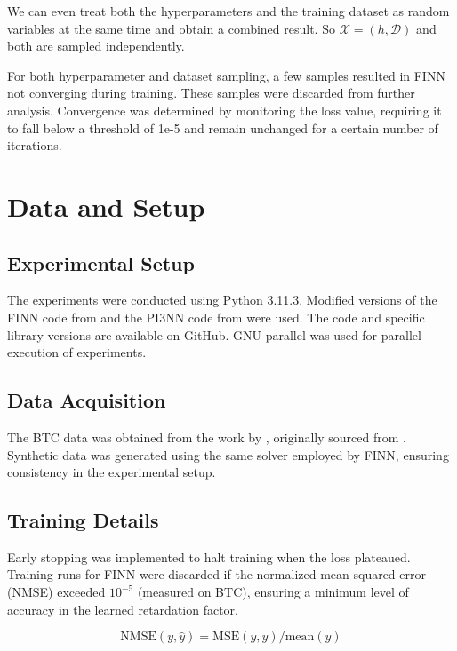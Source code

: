 We can even treat both the hyperparameters and the training dataset as random variables at the same time and obtain a combined result. So $\mathcal{X} = (h, \mathcal{D})$ and both are sampled independently.

For both hyperparameter and dataset sampling, a few samples resulted in FINN not converging during training. These samples were discarded from further analysis. Convergence was determined by monitoring the loss value, requiring it to fall below a threshold of 1e-5 and remain unchanged for a certain number of iterations.


\section{Data and Setup}

\subsection{Experimental Setup}
The experiments were conducted using Python 3.11.3. Modified versions of the FINN code from \cite{finn} and the PI3NN code from \cite{pi3nn} were used. The code and specific library versions are available on GitHub. GNU parallel \cite{tange_2023_10199085} was used for parallel execution of experiments. %

\subsection{Data Acquisition}
The BTC data was obtained from the work by \cite{finn}, originally sourced from \cite{nowak2016entropy}. Synthetic data was generated using the same solver employed by FINN, ensuring consistency in the experimental setup.

\subsection{Training Details}
Early stopping was implemented to halt training when the loss plateaued. Training runs for FINN were discarded if the normalized mean squared error (NMSE) exceeded $10^{-5}$ (measured on BTC), ensuring a minimum level of accuracy in the learned retardation factor.

\begin{equation*}
    \text{NMSE}(y, \hat{y}) = \text{MSE}(y, \hat{y}) / \text{mean}(y)
\end{equation*}




